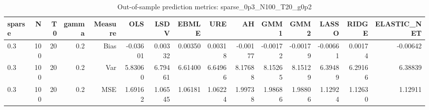 \begin{table}[!htbp]\centering
\caption{Out-of-sample prediction metrics: sparse_0p3_N100_T20_g0p2}
\label{tab:table3_sparse_0p3_N100_T20_g0p2}
\begin{tabular}{lrrrrrrrrrrrrrr}
\hline
sparse & N & T0 & gamma & Measure & OLS & LSDV & EBMLE & URE & AH & GMM1 & GMM2 & LASSO & RIDGE & ELASTIC_NET \\
\hline
0.3 & 100 & 20 & 0.2 & Bias & -0.03601 & 0.00332 & 0.00350 & 0.00318 & -0.00177 & -0.00172 & -0.00179 & -0.00661 & 0.00174 & -0.00642 \\
0.3 & 100 & 20 & 0.2 & Var & 5.83060 & 6.79461 & 6.61400 & 6.64966 & 8.17688 & 8.15265 & 8.15129 & 6.39489 & 6.29166 & 6.38839 \\
0.3 & 100 & 20 & 0.2 & MSE & 1.69162 & 1.06545 & 1.06181 & 1.06224 & 1.99738 & 1.98686 & 1.98806 & 1.12924 & 1.12630 & 1.12911 \\
\hline
\end{tabular}
\end{table}

